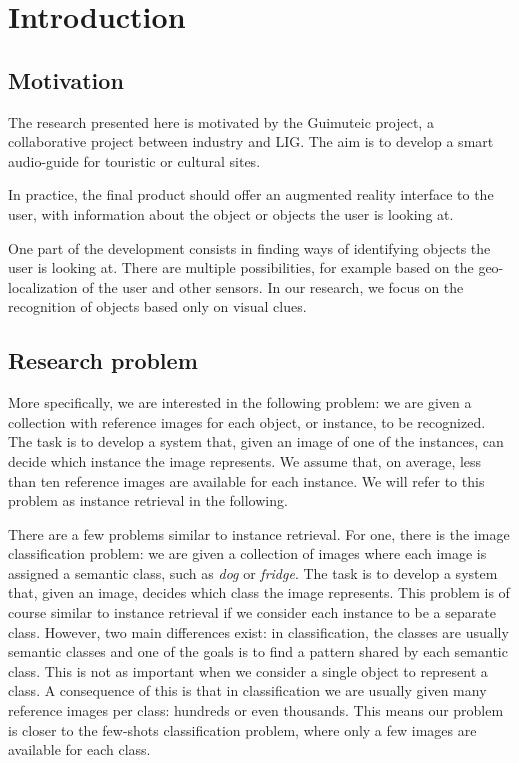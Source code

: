 
\chapter{Introduction}
\section{Motivation}
The research presented here is motivated by the Guimuteic project,
a collaborative project between industry and LIG. The
aim is to develop a smart audio-guide for touristic or cultural sites.

In practice, the final product should offer an augmented reality
interface to the user, with information about the object or objects
the user is looking at.

One part of the development consists in finding ways of identifying
objects the user is looking at. There are multiple possibilities,
for example based on the geo-localization of the user and other sensors.
In our research, we focus on the recognition of objects based
only on visual clues.

\section{Research problem}
More specifically, we are interested in the following problem:
we are given a collection with reference images for each object,
or instance, to be recognized. The task is to develop a system that,
given an image of one of the instances, can decide which instance
the image represents. We assume that, on average, less than ten reference
images are available for each instance.
We will refer to this problem as instance retrieval in the following.

There are a few problems similar to instance retrieval. For one, there is
the image classification problem: we are given a collection of images
where each image is assigned a semantic class,
such as \emph{dog} or \emph{fridge}.
The task is to develop a system that, given an image, decides which
class the image represents.
This problem is of course similar to instance retrieval if we
consider each instance to be a separate class.
However, two main differences exist: in classification, the classes are
usually semantic classes and one of the goals is to find a pattern shared
by each semantic class. This is not as important when we consider a single
object to represent a class. A consequence of this is that in classification
we are usually given many reference images per class:
hundreds or even thousands.
This means our problem is closer to the few-shots classification problem,
where only a few images are available for each class.

